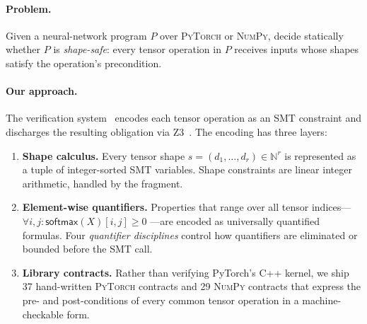 \documentclass[11pt]{article}
\newcommand{\TSoftmax}{\mathsf{softmax}}           %
\newcommand{\PyTorch}{\textsc{PyTorch}\xspace}
\newcommand{\NumPy}{\textsc{NumPy}\xspace}
\newcommand{\dimvar}[1]{d_{#1}}                    %
\begin{document}
\paragraph{Problem.}
Given a neural-network program $P$ over \PyTorch or \NumPy, decide
statically whether $P$ is \emph{shape-safe}: every tensor operation in
$P$ receives inputs whose shapes satisfy the operation's precondition.

\paragraph{Our approach.}
The \JuGeo{} verification system~\cite{jg01} encodes each tensor
operation as an SMT constraint and discharges the resulting obligation
via Z3~\cite{z3}.  The encoding has three layers:

\begin{enumerate}[leftmargin=*,label=\textbf{\arabic*.}]
\item \textbf{Shape calculus.}  Every tensor shape
      $s = (\dimvar{1}, \ldots, \dimvar{r}) \in \mathbb{N}^r$ is
      represented as a tuple of integer-sorted SMT variables.
      Shape constraints are linear integer arithmetic, handled by
      the \QFLIA{} fragment.

\item \textbf{Element-wise quantifiers.}  Properties that range over
      all tensor indices---\eg $\forall i, j: \TSoftmax(X)[i,j] \geq 0$
      ---are encoded as universally quantified formulas.  Four
      \emph{quantifier disciplines} control how quantifiers are
      eliminated or bounded before the SMT call.

\item \textbf{Library contracts.}  Rather than verifying PyTorch's C++
      kernel, we ship 37 hand-written \PyTorch contracts and 29 \NumPy
      contracts that express the pre- and post-conditions of every
      common tensor operation in a machine-checkable form.
\end{enumerate}
\end{document}
